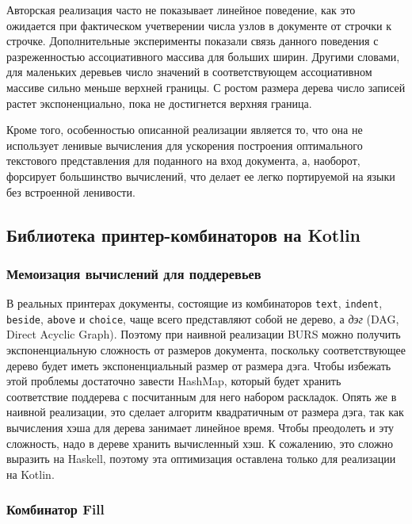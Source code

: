 Авторская реализация часто не показывает линейное поведение, как это ожидается при фактическом
учетверении числа узлов в документе от строчки к строчке. Дополнительные эксперименты показали
связь данного поведения с разреженностью ассоциативного массива для больших ширин.
Другими словами, для маленьких деревьев число значений в соответствующем ассоциативном массиве
сильно меньше верхней границы. С ростом размера дерева число записей растет
экспоненциально, пока не достигнется верхняя граница.

Кроме того, особенностью описанной реализации является то, что она не использует 
ленивые вычисления для ускорения построения оптимального текстового представления для
поданного на вход документа, а, наоборот,
форсирует большинство вычислений, что делает ее легко портируемой на языки
без встроенной ленивости.



\newpage
\subsection{Библиотека принтер-комбинаторов на Kotlin}

\subsubsection{Мемоизация вычислений для поддеревьев}

В реальных принтерах документы, состоящие из комбинаторов
\lstinline[language=Haskell]{text},
\lstinline[language=Haskell]{indent},
\lstinline[language=Haskell]{beside},
\lstinline[language=Haskell]{above} и \lstinline[language=Haskell]{choice}, чаще всего
представляют собой не дерево, а \textit{дэг} (DAG, Direct Acyclic Graph). Поэтому при наивной
реализации BURS можно получить экспоненциальную сложность от размеров документа,
поскольку соответствующее дерево будет иметь экспоненциальный размер от размера дэга.
Чтобы избежать этой проблемы достаточно завести HashMap, который будет хранить соответствие
поддерева с посчитанным для него набором раскладок. Опять же в наивной реализации,
это сделает алгоритм квадратичным от размера дэга, так как вычисления хэша для дерева занимает
линейное время. Чтобы преодолеть и эту сложность, надо в дереве хранить вычисленный хэш.
К сожалению, это сложно выразить на Haskell, поэтому эта оптимизация оставлена только для реализации
на Kotlin.

\subsubsection{Комбинатор Fill}

